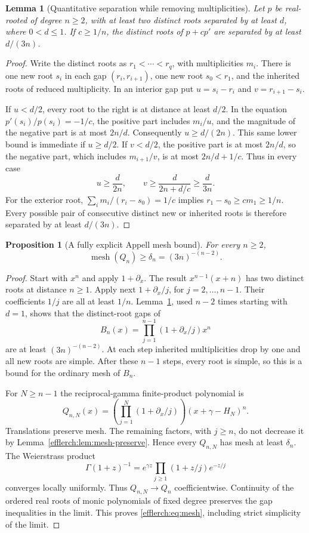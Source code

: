 \documentclass[11pt,letterpaper]{article}
\newtheorem{lemma}[theorem]{Lemma}
\newtheorem{proposition}[theorem]{Proposition}
\theoremstyle{definition}
\theoremstyle{remark}
\begin{document}
\begin{lemma}[Quantitative separation while removing multiplicities]
\label{efflerch:lem:split}
Let $p$ be real-rooted of degree $n\geq2$, with at least two distinct
roots separated by at least $d$, where $0<d\leq1$.  If $c\geq1/n$,
the distinct roots of $p+cp'$ are separated by at least $d/(3n)$.
\end{lemma}
\begin{proof}
Write the distinct roots as $r_1<\cdots<r_q$, with multiplicities $m_i$.
There is one new root $s_i$ in each gap $(r_i,r_{i+1})$, one new root
$s_0<r_1$, and the inherited roots of reduced multiplicity.  In an
interior gap put $u=s_i-r_i$ and $v=r_{i+1}-s_i$.

If $u<d/2$, every root to the right is at distance at least $d/2$.
In the equation $p'(s_i)/p(s_i)=-1/c$, the positive part includes
$m_i/u$, and the magnitude of the negative part is at most $2n/d$.
Consequently $u\geq d/(2n)$.  This same lower bound is immediate
if $u\geq d/2$.
If $v<d/2$, the positive part is at most $2n/d$, so the negative
part, which includes $m_{i+1}/v$, is at most $2n/d+1/c$.
Thus in every case
\[
 u\geq\frac{d}{2n},\qquad
 v\geq\frac{d}{2n+d/c}\geq\frac{d}{3n}.
\]
For the exterior root,
$\sum_i m_i/(r_i-s_0)=1/c$ implies $r_1-s_0\geq cm_1\geq1/n$.
Every possible pair of consecutive distinct new or inherited roots
is therefore separated by at least $d/(3n)$.
\end{proof}

\begin{proposition}[A fully explicit Appell mesh bound]
\label{efflerch:prop:mesh}
For every $n\geq2$,
\begin{equation}\label{efflerch:eq:mesh}
 \operatorname{mesh}(Q_n)\geq\delta_n=(3n)^{-(n-2)}.
\end{equation}
\end{proposition}
\begin{proof}
Start with $x^n$ and apply $1+\partial_x$.  The result
$x^{n-1}(x+n)$ has two distinct roots at distance $n\geq1$.
Apply next $1+\partial_x/j$, for $j=2,\ldots,n-1$.
Their coefficients $1/j$ are all at least $1/n$.
Lemma~\ref{efflerch:lem:split}, used $n-2$ times starting with $d=1$,
shows that the distinct-root gaps of
\[
 B_n(x)=\prod_{j=1}^{n-1}(1+\partial_x/j)x^n
\]
are at least $(3n)^{-(n-2)}$.  At each step inherited multiplicities
drop by one and all new roots are simple.  After these $n-1$ steps,
every root is simple, so this is a bound for the ordinary mesh of $B_n$.

For $N\geq n-1$ the reciprocal-gamma finite-product polynomial is
\[
 Q_{n,N}(x)=
  \left(\prod_{j=1}^N(1+\partial_x/j)\right)(x+\gamma-H_N)^n.
\]
Translations preserve mesh.  The remaining factors, with $j\geq n$,
do not decrease it by Lemma~\ref{efflerch:lem:mesh-preserve}.
Hence every $Q_{n,N}$ has mesh at least $\delta_n$.
The Weierstrass product
\[
 \Gamma(1+z)^{-1}=e^{\gamma z}
   \prod_{j\geq1}(1+z/j)e^{-z/j}
\]
converges locally uniformly.  Thus $Q_{n,N}\to Q_n$ coefficientwise.
Continuity of the ordered real roots of monic polynomials of fixed
degree preserves the gap inequalities in the limit.  This proves
\eqref{efflerch:eq:mesh}, including strict simplicity of the limit.
\end{proof}
\end{document}
